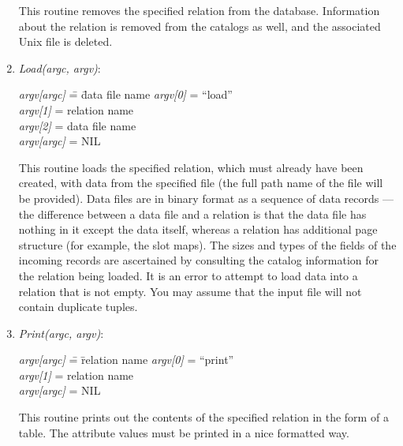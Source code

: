 \begin{enumerate}
This routine removes the specified relation from the database.
Information about the relation is removed from the catalogs as well,
and the associated Unix file is deleted.

\item\emph{Load(argc, argv)}:
\begin{tabbing}
\hspace*{0.2in}\emph{argv[argc]} \= = \= data file name \kill
\hspace*{0.2in}\emph{argv[0]}    \> = \> ``load''       \\
\hspace*{0.2in}\emph{argv[1]}    \> = \> relation name  \\
\hspace*{0.2in}\emph{argv[2]}    \> = \> data file name \\
\hspace*{0.2in}\emph{argv[argc]} \> = \> NIL
\end{tabbing}

This routine loads the specified relation, which must already have been
created, with data from the specified file (the full path name of the
file will be provided).  Data files are in binary
format as a sequence of data records --- the difference between a data
file and a relation is that the data file has nothing in it except the
data itself, whereas a relation has additional page structure (for
example, the slot maps).  The sizes and types of the fields of the
incoming records are ascertained by consulting the catalog information
for the relation being loaded.  It is an error to attempt to
load data into a relation that is not empty.  You may assume that the
input file will not contain duplicate tuples.

\item\emph{Print(argc, argv)}:
\begin{tabbing}
\hspace*{0.2in}\emph{argv[argc]} \= = \= relation name   \kill
\hspace*{0.2in}\emph{argv[0]}    \> = \> ``print''       \\
\hspace*{0.2in}\emph{argv[1]}    \> = \> relation name   \\
\hspace*{0.2in}\emph{argv[argc]} \> = \> NIL
\end{tabbing}

This routine prints out the contents of the specified relation in the
form of a table.  The attribute values must be printed in a 
nice formatted way. 


\end{enumerate}
